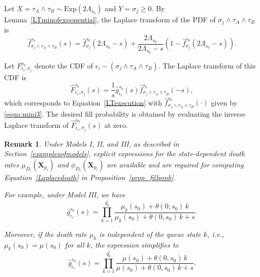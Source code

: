 \documentclass[11pt]{article}
\newtheorem{remark}{Remark}
\newenvironment{proof}{\noindent{\it Proof.}}{\hfill\fbox{}\vspace*{1mm}}
\begin{document}
\begin{proof}
\begin{enumerate}
    Let \( X = \tau_A \wedge \tau_B \sim \text{Exp}(2\Lambda_{s_0}) \) and \( Y = \sigma_j \geq 0 \). By Lemma~\ref{LTminofexponential}, the Laplace transform of the PDF of \( \sigma_j \wedge \tau_A \wedge \tau_B \) is
    \begin{equation}\label{equa:mini3}
        \hat{f}_{\sigma_j \wedge \tau_A \wedge \tau_B}^{s_0}(s) = \hat{f}_{\sigma_j}^{s_0}(2\Lambda_{s_0} - s) + \frac{2\Lambda_{s_0}}{2\Lambda_{s_0} - s} \left(1 - \hat{f}_{\sigma_j}^{s_0}(2\Lambda_{s_0} - s)\right).
    \end{equation}

    Let \( F_{\epsilon_i, \sigma_j}^{s_0} \) denote the CDF of \( \epsilon_i - (\sigma_j \wedge \tau_A \wedge \tau_B) \). The Laplace transform of this CDF is
    \begin{equation}
        \hat{F}_{\epsilon_i, \sigma_j}^{s_0}(s) = \frac{1}{s} \hat{g}_{\epsilon_i}^{s_0}(s) \hat{f}_{\sigma_j \wedge \tau_A \wedge \tau_B}^{s_0}(-s),
    \end{equation}
    which corresponds to Equation~\eqref{LTexecution} with $\hat{f}_{\sigma_j \wedge \tau_A \wedge \tau_B}^{s_0}(\cdot)$ given by \eqref{equa:mini3}. The desired fill probability is obtained by evaluating the inverse Laplace transform of \( \hat{F}_{\epsilon_i, \sigma_j}^{s_0}(s) \) at zero.
\end{enumerate}
\end{proof}


\begin{remark}\label{remark-pure-death}
Under Models I, II, and III, as described in Section~\ref{examplesofmodels}, explicit expressions for the state-dependent death rates \( \mu_{D_i}(\boldsymbol{X}_{p_i}) \) and \( \phi_{D_i}(\boldsymbol{X}_{p_i}) \) are available and are required for computing Equation~\eqref{Laplacedeath} in Proposition~\ref{prop_fillprob}.

For example, under Model III, we have
\begin{equation}\label{FP1transformmodel3}
    \hat{g}_{\epsilon_i}^{s_0}(s) = \prod_{k=1}^{q_0^i} \frac{\mu_k(s_0) + \theta(0, s_0)\,k}{\mu_k(s_0) + \theta(0, s_0)\,k + s}.
\end{equation}

Moreover, if the death rate \( \mu_k \) is independent of the queue state \( k \), i.e., \( \mu_k(s_0) = \mu(s_0) \) for all \( k \), the expression simplifies to
\begin{equation}\label{FP1transformmodel3simple}
    \hat{g}_{\epsilon_i}^{s_0}(s) = \prod_{k=1}^{q_0^i} \frac{\mu(s_0) + \theta(0, s_0)\,k}{\mu(s_0) + \theta(0, s_0)\,k + s}.
\end{equation}
\end{remark}
\end{document}
